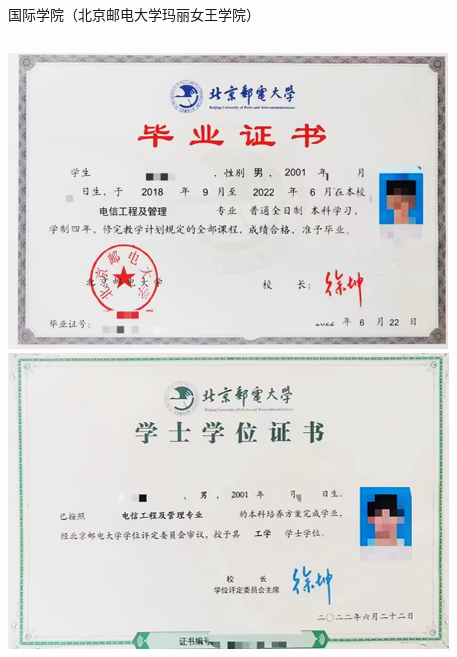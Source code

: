 \documentclass[aspectratio=169, utf8]{beamer}
\begin{document}
\begin{frame}{国际学院（北京邮电大学玛丽女王学院）}
    \begin{columns}
        \includegraphics[width=\textwidth]{./resources/15.png}\\
        \includegraphics[width=\textwidth]{./resources/16.png}


\end{columns}
\end{frame}
\end{document}
